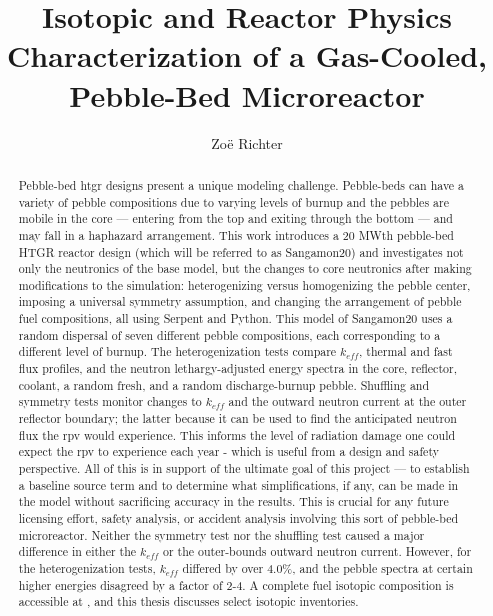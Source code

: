 \documentclass[edeposit,fullpage]{uiucthesis2018}
\title{Isotopic and Reactor Physics Characterization of a Gas-Cooled, Pebble-Bed Microreactor}
\author{Zo{\"e} Richter}
\begin{document}
\maketitle

\frontmatter
\begin{abstract}
Pebble-bed \acrfull{htgr} designs present a unique modeling challenge.  Pebble-beds can have a variety of pebble compositions due to varying levels of burnup and the pebbles are mobile in the core --- entering from the top and exiting through the bottom --- and may fall in a haphazard arrangement.  This work introduces a 20 MWth pebble-bed HTGR reactor design (which will be referred to as Sangamon20) and investigates not only the neutronics of the base model, but the changes to core neutronics after making modifications to the simulation: heterogenizing versus homogenizing the pebble center, imposing a universal symmetry assumption, and changing the arrangement of pebble fuel compositions, all using Serpent and Python.  This model of Sangamon20 uses a random dispersal of seven different pebble compositions, each corresponding to a different level of burnup.  The heterogenization tests compare $k_{eff}$, thermal and fast flux profiles, and the neutron lethargy-adjusted energy spectra in the core, reflector, coolant, a random fresh, and a random discharge-burnup pebble.  Shuffling and symmetry tests monitor changes to $k_{eff}$ and the outward neutron current at the outer reflector boundary; the latter because it can be used to find the anticipated neutron flux the \acrfull{rpv} would experience.  This informs the level of radiation damage one could expect the \acrshort{rpv} to experience each year - which is useful from a design and safety perspective.  All of this is in support of the ultimate goal of this project --- to establish a baseline source term and to determine what simplifications, if any, can be made in the model without sacrificing accuracy in the results.  This is crucial for any future licensing effort, safety analysis, or accident analysis involving this sort of pebble-bed microreactor.  Neither the symmetry test nor the shuffling test caused a major difference in either the $k_{eff}$ or the outer-bounds outward neutron current.  However, for the heterogenization tests, $k_{eff}$ differed by over 4.0\%, and the pebble spectra at certain higher energies disagreed by a factor of 2-4.  A complete fuel isotopic composition is accessible at \cite{richter_isotopic_2021}, and this thesis discusses select isotopic inventories.

\end{abstract}
\end{document}
